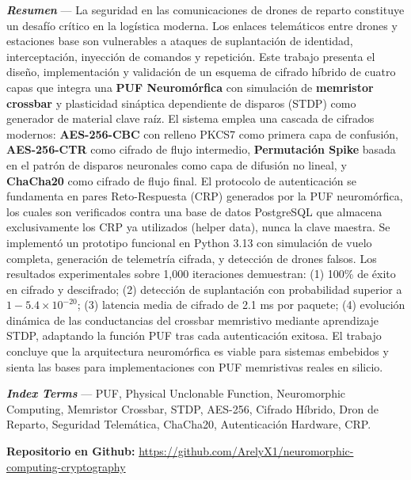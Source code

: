 \textbf{\textit{Resumen}} — La seguridad en las comunicaciones de drones de reparto constituye un desafío crítico en la logística moderna. Los enlaces telemáticos entre drones y estaciones base son vulnerables a ataques de suplantación de identidad, interceptación, inyección de comandos y repetición. Este trabajo presenta el diseño, implementación y validación de un esquema de cifrado híbrido de cuatro capas que integra una \textbf{PUF Neuromórfica} con simulación de \textbf{memristor crossbar} y plasticidad sináptica dependiente de disparos (STDP) como generador de material clave raíz. El sistema emplea una cascada de cifrados modernos: \textbf{AES-256-CBC} con relleno PKCS7 como primera capa de confusión, \textbf{AES-256-CTR} como cifrado de flujo intermedio, \textbf{Permutación Spike} basada en el patrón de disparos neuronales como capa de difusión no lineal, y \textbf{ChaCha20} como cifrado de flujo final. El protocolo de autenticación se fundamenta en pares Reto-Respuesta (CRP) generados por la PUF neuromórfica, los cuales son verificados contra una base de datos PostgreSQL que almacena exclusivamente los CRP ya utilizados (helper data), nunca la clave maestra. Se implementó un prototipo funcional en Python 3.13 con simulación de vuelo completa, generación de telemetría cifrada, y detección de drones falsos. Los resultados experimentales sobre 1,000 iteraciones demuestran: (1) 100\% de éxito en cifrado y descifrado; (2) detección de suplantación con probabilidad superior a $1 - 5.4 \times 10^{-20}$; (3) latencia media de cifrado de 2.1 ms por paquete; (4) evolución dinámica de las conductancias del crossbar memristivo mediante aprendizaje STDP, adaptando la función PUF tras cada autenticación exitosa. El trabajo concluye que la arquitectura neuromórfica es viable para sistemas embebidos y sienta las bases para implementaciones con PUF memristivas reales en silicio.
\vspace{0.5em}

\textbf{\textit{Index Terms}} — PUF, Physical Unclonable Function, Neuromorphic Computing, Memristor Crossbar, STDP, AES-256, Cifrado Híbrido, Dron de Reparto, Seguridad Telemática, ChaCha20, Autenticación Hardware, CRP.

\vspace{0.3em}
\centerline{\tiny\textbf{Repositorio en Github:} \url{https://github.com/ArelyX1/neuromorphic-computing-cryptography}}
